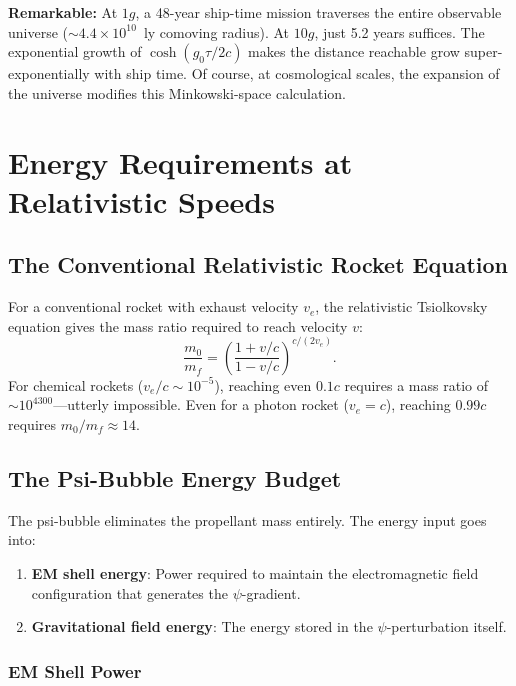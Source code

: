 \documentclass[aps,prd,twocolumn,superscriptaddress,nofootinbib]{revtex4-2}
\newcommand{\ee}[1]{\times 10^{#1}}
\begin{document}
\textbf{Remarkable:} At $1g$, a 48-year ship-time mission traverses
the entire observable universe ($\sim 4.4\ee{10}$~ly comoving radius).
At $10g$, just 5.2 years suffices. The exponential growth of
$\cosh(g_0\tau/2c)$ makes the distance reachable grow
super-exponentially with ship time. Of course, at cosmological scales,
the expansion of the universe modifies this Minkowski-space calculation.

\section{Energy Requirements at Relativistic Speeds}\label{sec:energy}

\subsection{The Conventional Relativistic Rocket Equation}

For a conventional rocket with exhaust velocity $v_e$, the
relativistic Tsiolkovsky equation gives the mass ratio required to
reach velocity $v$:
\begin{equation}\label{eq:rocket-eq}
\frac{m_0}{m_f} = \left(\frac{1 + v/c}{1 - v/c}\right)^{c/(2v_e)}.
\end{equation}
For chemical rockets ($v_e/c \sim 10^{-5}$), reaching even $0.1c$
requires a mass ratio of $\sim 10^{4300}$---utterly impossible.
Even for a photon rocket ($v_e = c$), reaching $0.99c$ requires
$m_0/m_f \approx 14$.

\subsection{The Psi-Bubble Energy Budget}

The psi-bubble eliminates the propellant mass entirely.  The energy
input goes into:
\begin{enumerate}
\item \textbf{EM shell energy}: Power required to maintain the
electromagnetic field configuration that generates the $\psi$-gradient.
\item \textbf{Gravitational field energy}: The energy stored in the
$\psi$-perturbation itself.
\end{enumerate}

\subsubsection{EM Shell Power}
\end{document}

